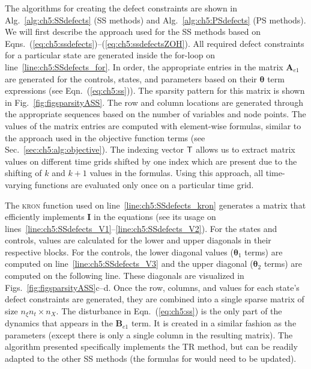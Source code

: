 The algorithms for creating the defect constraints are shown in Alg.~\ref{alg:ch5:SSdefects} (SS methods) and Alg.~\ref{alg:ch5:PSdefects} (PS methods).
We will first describe the approach used for the SS methods based on Eqns.~(\ref{eq:ch5:ssdefects})--(\ref{eq:ch5:ssdefectsZOH}).
All required defect constraints for a particular state are generated inside the for-loop on line~\ref{line:ch5:SSdefects_for}.
In order, the appropriate entries in the matrix $\mathbf{A}_{e1}$ are generated for the controls, states, and parameters based on their $\bm{\theta}$ term expressions (see Eqn.~(\ref{eq:ch5:ss})).
The sparsity pattern for this matrix is shown in Fig.~\ref{fig:figsparsityASS}.
The row and column locations are generated through the appropriate sequences based on the number of variables and node points.
The values of the matrix entries are computed with element-wise formulas, similar to the approach used in the objective function terms (see Sec.~\ref{sec:ch5:alg:objective}).
The indexing vector $\textup{\textsf{T}}$ allows us to extract matrix values on different time grids shifted by one index which are present due to the shifting of $k$ and $k+1$ values in the formulas.
Using this approach, all time-varying functions are evaluated only once on a particular time grid.

The \textsc{kron} function\cite{matlab-kron} used on line~\ref{line:ch5:SSdefects_kron} generates a matrix that efficiently implements $\bm{I}$ in the equations (see its usage on lines~\ref{line:ch5:SSdefects_V1}--\ref{line:ch5:SSdefects_V2}).
For the states and controls, values are calculated for the lower and upper diagonals in their respective blocks.
For the controls, the lower diagonal values ($\bm{\theta}_1$ terms) are computed on line~\ref{line:ch5:SSdefects_V3} and the upper diagonal ($\bm{\theta}_2$ terms) are computed on the following line.
These diagonals are visualized in Figs.~\ref{fig:figsparsityASS}c--d.
Once the row, columns, and values for each state's defect constraints are generated, they are combined into a single sparse matrix of size $n_{\xi} n_t \times n_{X}$.
The disturbance in Eqn.~(\ref{eq:ch5:ss}) is the only part of the dynamics that appears in the $\mathbf{B}_{e1}$ term.
It is created in a similar fashion as the parameters (except there is only a single column in the resulting matrix).
The algorithm presented specifically implements the TR method, but can be readily adapted to the other SS methods (the formulas for  would need to be updated).

